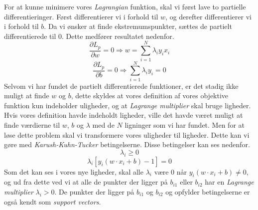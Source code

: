 \documentclass{article}
\begin{document}
For at kunne minimere vores \textit{Lagrangian} funktion, skal vi først lave to partielle differentieringer. Først differentierer vi i forhold til $w$, og derefter differentierer vi i forhold til $b$. Da vi ønsker at finde ekstremumspunkter, sættes de partielt differentierede til 0. Dette medfører resultatet nedenfor.
\begin{equation}
\label{eq:partial_L_pw}
\frac{\partial L_p}{\partial w} = 0 \Rightarrow w = \sum\limits_{i=1}^N \lambda_i y_i x_i
\end{equation}
\begin{equation}
\label{eq:partial_L_pb}
\frac{\partial L_p}{\partial b} = 0 \Rightarrow \sum\limits_{i=1}^N \lambda_i y_i = 0
\end{equation}
Selvom vi har fundet de partielt differentierede funktioner, er det stadig ikke muligt at finde $w$ og $b$, dette skyldes at vores definition af vores objektive funktion kun indeholder uligheder, og at \textit{Lagrange multiplier} skal bruge ligheder. Hvis vores definition havde indeholdt ligheder, ville det havde været muligt at finde værdierne til $w$, $b$ og $\lambda$ med de $N$ ligninger som vi har fundet. Men for at løse dette problem skal vi transformere vores uligheder til ligheder. Dette kan vi gøre med \textit{Karush-Kuhn-Tucker} betingelserne. Disse betingelser kan ses nedenfor.
\begin{equation}
\label{eq:constraint_lambda_i1}
\lambda_i \geq 0
\end{equation}
\begin{equation}
\label{eq:constraint_lambda_i2}
\lambda_i[y_i(w \cdot x_i + b) - 1] = 0
\end{equation}
Som det kan ses i vores nye ligheder, skal alle $\lambda_i$ være $0$ når $y_i(w \cdot x_i + b) \neq 0$, og ud fra dette ved vi at alle de punkter der ligger på $b_{i1}$ eller $b_{i2}$ har en \textit{Lagrange multiplier} $\lambda_i > 0$.  De punkter der ligger på $b_{i1}$ og $b_{i2}$ og opfylder betingelserne er også kendt som \textit{support vectors}.
\end{document}
